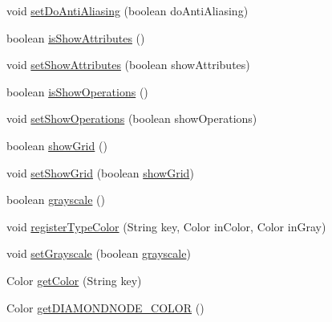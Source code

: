 \begin{DoxyCompactItemize}
\item 
void \hyperlink{classorg_1_1tzi_1_1use_1_1gui_1_1views_1_1diagrams_1_1_diagram_options_ac3e8c77617439964e5f091a1997f1271}{set\-Do\-Anti\-Aliasing} (boolean do\-Anti\-Aliasing)
\item 
boolean \hyperlink{classorg_1_1tzi_1_1use_1_1gui_1_1views_1_1diagrams_1_1_diagram_options_a0aa54695353cdc17c798d1bd6b2f5970}{is\-Show\-Attributes} ()
\item 
void \hyperlink{classorg_1_1tzi_1_1use_1_1gui_1_1views_1_1diagrams_1_1_diagram_options_ae8d9043b013b73dbc9966fe2da40dc6d}{set\-Show\-Attributes} (boolean show\-Attributes)
\item 
boolean \hyperlink{classorg_1_1tzi_1_1use_1_1gui_1_1views_1_1diagrams_1_1_diagram_options_a177e8528f11080ae86b5f9a455f232c6}{is\-Show\-Operations} ()
\item 
void \hyperlink{classorg_1_1tzi_1_1use_1_1gui_1_1views_1_1diagrams_1_1_diagram_options_ae58b392bb1a72940ff75fa9a754c6ef2}{set\-Show\-Operations} (boolean show\-Operations)
\item 
boolean \hyperlink{classorg_1_1tzi_1_1use_1_1gui_1_1views_1_1diagrams_1_1_diagram_options_a017b12be76c2683d8deafc5f28062320}{show\-Grid} ()
\item 
void \hyperlink{classorg_1_1tzi_1_1use_1_1gui_1_1views_1_1diagrams_1_1_diagram_options_a95073b09ecb70fca1d84c5b89758f714}{set\-Show\-Grid} (boolean \hyperlink{classorg_1_1tzi_1_1use_1_1gui_1_1views_1_1diagrams_1_1_diagram_options_a017b12be76c2683d8deafc5f28062320}{show\-Grid})
\item 
boolean \hyperlink{classorg_1_1tzi_1_1use_1_1gui_1_1views_1_1diagrams_1_1_diagram_options_a45efbcbd3e8a965533b8b7428f00d481}{grayscale} ()
\item 
void \hyperlink{classorg_1_1tzi_1_1use_1_1gui_1_1views_1_1diagrams_1_1_diagram_options_a477336ebe04f35bca1e40708613655bd}{register\-Type\-Color} (String key, Color in\-Color, Color in\-Gray)
\item 
void \hyperlink{classorg_1_1tzi_1_1use_1_1gui_1_1views_1_1diagrams_1_1_diagram_options_abf6a72b4bca29ea0be4af9c66586b42c}{set\-Grayscale} (boolean \hyperlink{classorg_1_1tzi_1_1use_1_1gui_1_1views_1_1diagrams_1_1_diagram_options_a45efbcbd3e8a965533b8b7428f00d481}{grayscale})
\item 
Color \hyperlink{classorg_1_1tzi_1_1use_1_1gui_1_1views_1_1diagrams_1_1_diagram_options_ad008e4cd72a92718950166a90720a4f5}{get\-Color} (String key)
\item 
Color \hyperlink{classorg_1_1tzi_1_1use_1_1gui_1_1views_1_1diagrams_1_1_diagram_options_a34414b4f12d71b862bb6d00bb82612d9}{get\-D\-I\-A\-M\-O\-N\-D\-N\-O\-D\-E\-\_\-\-C\-O\-L\-O\-R} ()

\end{DoxyCompactItemize}
